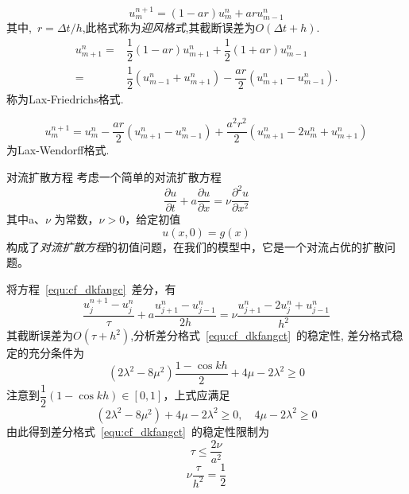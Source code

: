 \documentclass[xcolor=svgnames]{beamer} %
\begin{document}
\begin{frame}
\begin{equation}\label{eq:04_dl_yf}
 u_m^{n+1}=(1-ar)u_m^n+aru_{m-1}^n
\end{equation}
其中,~$r=\Delta t/h$,此格式称为\emph{迎风格式},其截断误差为$O(\Delta t+h)$.
\begin{equation}\label{eq:04_dl_laxf}
\begin{split}
u_{m+1}^n =& \dfrac{1}{2}(1-ar)u_{m+1}^n+\dfrac{1}{2}(1+ar)u_{m-1}^n \\
          =& \dfrac{1}{2}(u_{m-1}^n+u_{m+1}^n)-\dfrac{ar}{2}(u_{m+1}^n-u_{m-1}^n).
\end{split}
\end{equation}
称为Lax-Friedrichs格式.\par
\begin{equation}\label{eq:04_dl_laxw}
u_m^{n+1}=u_m^n-\dfrac{ar}{2}(u_{m+1}^n-u_{m-1}^n)+\dfrac{a^2 r^2}{2}
(u_{m+1}^n-2u_m^n+u_{m+1}^n)
\end{equation}
为Lax-Wendorff格式.
\end{frame}
\begin{frame}{对流扩散方程}
考虑一个简单的对流扩散方程
\begin{equation}\label{equ:cf_dkfangc}
	\dfrac{\partial u}{\partial t}+a\dfrac{\partial u}{\partial x}=\nu\dfrac{\partial^2 u}{\partial x^2}
\end{equation}
其中a、$\nu$ 为常数，$\nu>0$，给定初值
\begin{equation}
	u(x,0)=g(x)
\end{equation}
构成了\emph{对流扩散方程}的初值问题，在我们的模型中，它是一个对流占优的扩散问题。\par
\end{frame}
\begin{frame}
将方程~\eqref{equ:cf_dkfangc}~差分，有
\begin{equation}\label{equ:cf_dkfangct}
	\dfrac{u^{n+1}_j-u^{n}_{j}}{\tau}+a\dfrac{u^{n}_{j+1}-u^n_{j-1}}{2h}=\nu\dfrac{u^n_{j+1}-2u^n_j+u^n_{j-1}}{h^2}
\end{equation}其截断误差为$O(\tau+h^2)$,分析差分格式~\eqref{equ:cf_dkfangct}~的稳定性,
差分格式稳定的充分条件为
\begin{equation}
(2\lambda^2-8\mu^2)\dfrac{1-\cos kh}{2}+4\mu-2\lambda^2 \geq 0
\end{equation}
注意到$\dfrac{1}{2}(1-\cos kh)\in[0,1]$，上式应满足
\begin{equation}
(2\lambda^2-8\mu^2)+4\mu-2\lambda^2 \geq 0,\quad 4\mu-2\lambda^2 \geq 0
\end{equation}
由此得到差分格式~\eqref{equ:cf_dkfangct}~的稳定性限制为
\begin{equation}
\tau \leq \dfrac{2\nu}{a^2}
\end{equation}
\begin{equation}
\nu\dfrac{\tau}{h^2}=\dfrac{1}{2}
\end{equation}\par
\end{frame}
\end{document}
